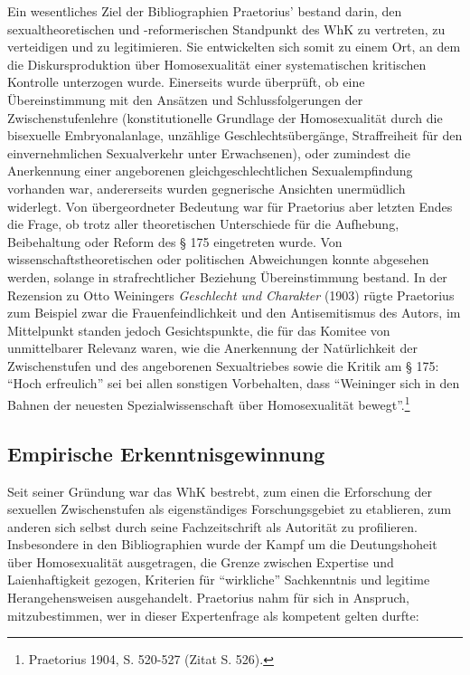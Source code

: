 \documentclass[a4paper,
fontsize=11pt,
oneside,
numbers=noperiodatend,
parskip=half-,
bibliography=totoc,
final
]{scrartcl}
\begin{document}
Ein wesentliches Ziel der Bibliographien Praetorius' bestand darin, den
sexualtheoretischen und -reformerischen Standpunkt des WhK zu vertreten,
zu verteidigen und zu legitimieren. Sie entwickelten sich somit zu einem
Ort, an dem die Diskursproduktion über Homosexualität einer
systematischen kritischen Kontrolle unterzogen wurde. Einerseits wurde
überprüft, ob eine Übereinstimmung mit den Ansätzen und
Schlussfolgerungen der Zwischenstufenlehre (konstitutionelle Grundlage
der Homosexualität durch die bisexuelle Embryonalanlage, unzählige
Geschlechtsübergänge, Straffreiheit für den einvernehmlichen
Sexualverkehr unter Erwachsenen), oder zumindest die Anerkennung einer
angeborenen gleichgeschlechtlichen Sexualempfindung vorhanden war,
andererseits wurden gegnerische Ansichten unermüdlich widerlegt. Von
übergeordneter Bedeutung war für Praetorius aber letzten Endes die
Frage, ob trotz aller theoretischen Unterschiede für die Aufhebung,
Beibehaltung oder Reform des § 175 eingetreten wurde. Von
wissenschaftstheoretischen oder politischen Abweichungen konnte
abgesehen werden, solange in strafrechtlicher Beziehung Übereinstimmung
bestand. In der Rezension zu Otto Weiningers \emph{Geschlecht und
Charakter} (1903) rügte Praetorius zum Beispiel zwar die
Frauenfeindlichkeit und den Antisemitismus des Autors, im Mittelpunkt
standen jedoch Gesichtspunkte, die für das Komitee von unmittelbarer
Relevanz waren, wie die Anerkennung der Natürlichkeit der Zwischenstufen
und des angeborenen Sexualtriebes sowie die Kritik am § 175:
\enquote{Hoch erfreulich} sei bei allen sonstigen Vorbehalten, dass
\enquote{Weininger sich in den Bahnen der neuesten Spezialwissenschaft
über Homosexualität bewegt}.\footnote{Praetorius 1904, S. 520-527 (Zitat
  S. 526).}

\subsection*{Empirische
Erkenntnisgewinnung}\label{empirische-erkenntnisgewinnung}

Seit seiner Gründung war das WhK bestrebt, zum einen die Erforschung der
sexuellen Zwischenstufen als eigenständiges Forschungsgebiet zu
etablieren, zum anderen sich selbst durch seine Fachzeitschrift als
Autorität zu profilieren. Insbesondere in den Bibliographien wurde der
Kampf um die Deutungshoheit über Homosexualität ausgetragen, die Grenze
zwischen Expertise und Laienhaftigkeit gezogen, Kriterien für
\enquote{wirkliche} Sachkenntnis und legitime Herangehensweisen
ausgehandelt. Praetorius nahm für sich in Anspruch, mitzubestimmen, wer
in dieser Expertenfrage als kompetent gelten durfte:
\end{document}
